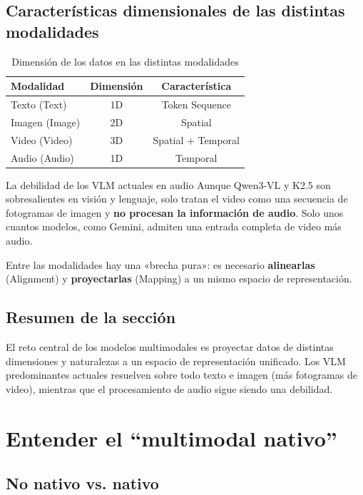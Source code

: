 \documentclass[a4paper]{article}
\begin{document}
\subsection{Características dimensionales de las distintas modalidades}

\begin{table}[H]
\centering
\caption{Dimensión de los datos en las distintas modalidades}
\begin{tabular}{lcc}
\toprule
\textbf{Modalidad} & \textbf{Dimensión} & \textbf{Característica} \\
\midrule
Texto (Text) & 1D & Token Sequence \\
Imagen (Image) & 2D & Spatial \\
Video (Video) & 3D & Spatial + Temporal \\
Audio (Audio) & 1D & Temporal \\
\bottomrule
\end{tabular}
\end{table}

\begin{warningbox}{La debilidad de los VLM actuales en audio}
Aunque Qwen3-VL y K2.5 son sobresalientes en visión y lenguaje, solo tratan el video como una secuencia de fotogramas de imagen y \textbf{no procesan la información de audio}. Solo unos cuantos modelos, como Gemini, admiten una entrada completa de video más audio.
\end{warningbox}

Entre las modalidades hay una «brecha pura»: es necesario \textbf{alinearlas} (Alignment) y \textbf{proyectarlas} (Mapping) a un mismo espacio de representación.

\subsection{Resumen de la sección}

El reto central de los modelos multimodales es proyectar datos de distintas dimensiones y naturalezas a un espacio de representación unificado. Los VLM predominantes actuales resuelven sobre todo texto e imagen (más fotogramas de video), mientras que el procesamiento de audio sigue siendo una debilidad.
\section{Entender el ``multimodal nativo''}

\subsection{No nativo vs. nativo}
\end{document}
